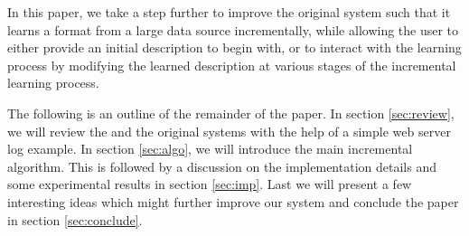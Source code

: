 In this paper, we take a step further to improve the original \learnpads{} system
such that it learns a format from a large data source incrementally,
while allowing the user to either provide an initial description to begin with,
or to interact with the learning process by modifying the learned description
at various stages of the incremental learning process.

The following is an outline of the remainder of the paper. In section \ref{sec:review},
we will review the \pads{} and the original \learnpads{} systems with the help of 
a simple web server log example. In section \ref{sec:algo}, we will introduce the main incremental
algorithm. This is followed by a discussion on the implementation details and
some experimental results in section \ref{sec:imp}. Last we will present 
a few interesting ideas which might further improve our system and conclude
the paper in section \ref{sec:conclude}.

%
%
%
